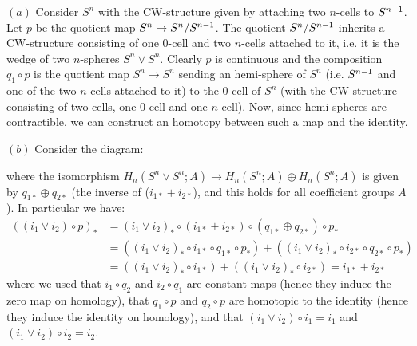 \documentclass[a4paper,11pt,english]{article}
\begin{document}

\begin{exercise}[2]

$(a)$ Consider $S^n$ with the CW-structure given by attaching two $n$-cells to $S^{n-1}$. Let $p$ be the quotient map $S^n\to S^n/S^{n-1}$. The quotient $S^n/S^{n-1}$ inherits a CW-structure consisting of one $0$-cell and two $n$-cells attached to it, i.e. it is the wedge of two $n$-spheres $S^n\vee S^n$. Clearly $p$ is continuous and the composition $q_1\circ p$ is the quotient map $S^n\to S^n$ sending an hemi-sphere of $S^n$ (i.e. $S^{n-1}$ and one of the two $n$-cells attached to it) to the $0$-cell of $S^n$ (with the CW-structure consisting of two cells, one $0$-cell and one $n$-cell). Now, since hemi-spheres are contractible, we can construct an homotopy between such a map and the identity. \bigskip

$(b)$ Consider the diagram:
\begin{center}
\end{center}
where the isomorphism $H_n(S^n\vee S^n;A)\to H_n(S^n;A)\oplus H_n(S^n;A)$ is given by $q_{1*}\oplus q_{2*}$ (the inverse of ($i_{1*}+i_{2*}$), and this holds for all coefficient groups $A$). In particular we have:
\begin{align*}
    ((i_1\vee i_2)\circ p)_* &= (i_1\vee i_2)_*\circ (i_{1*}+i_{2*}) \circ (q_{1*}\oplus q_{2*}) \circ p_* \\
    &= ((i_1\vee i_2)_*\circ i_{1*} \circ q_{1*} \circ p_*) + ((i_1\vee i_2)_*\circ i_{2*} \circ q_{2*} \circ p_*) \\
    &= ((i_1\vee i_2)_*\circ i_{1*}) + ((i_1\vee i_2)_*\circ i_{2*}) = i_{1*} + i_{2*}
\end{align*}
where we used that $i_1\circ q_2$ and $i_2\circ q_1$ are constant maps (hence they induce the zero map on homology), that $q_1\circ p$ and $q_2\circ p$ are homotopic to the identity (hence they induce the identity on homology), and that $(i_1\vee i_2)\circ i_1=i_1$ and $(i_1\vee i_2)\circ i_2=i_2$. \bigskip


\end{exercise}
\end{document}
